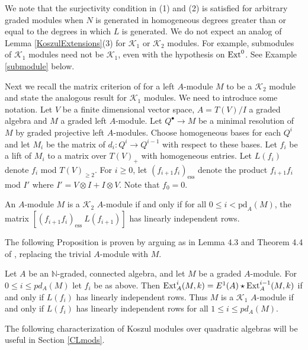 \documentclass[11pt,righttag]{amsart}
\begin{document}
We note that the surjectivity condition in (1) and (2) is satisfied for arbitrary graded modules when $N$ is generated in homogeneous degrees greater than or equal to the degrees in which $L$ is generated.
We do not expect an analog of Lemma \ref{KoszulExtensions}(3) for ${{\mathcal K}}_1$ or ${{\mathcal K}}_2$ modules. 
For example, submodules of ${{\mathcal K}}_1$ modules need not be ${{\mathcal K}}_1$, even with the hypothesis on ${\hbox{{\rm Ext}}}^0$. See Example \ref{submodule} below.  

Next we recall the matrix criterion of  \cite{CS} for a left $A$-module $M$ to be a ${{\mathcal K}}_2$ module and state the analogous result for ${{\mathcal K}}_1$ modules. We need to introduce some notation. Let $V$ be a finite dimensional vector space, $A=T(V)/I$ a graded algebra and $M$ a graded left $A$-module. Let $Q^{\bullet}\rightarrow M$ be a minimal resolution of $M$ by graded projective left $A$-modules. Choose homogeneous bases for each $Q^i$ and let $M_i$ be the matrix of $d_i:Q^i\rightarrow Q^{i-1}$ with respect to these bases. Let $f_i$ be a lift of $M_i$ to a matrix over $T(V)_+$ with homogeneous entries. Let $L(f_i)$ denote $f_i$ mod $T(V)_{\ge 2}$. For $i\ge 0$, let $(f_{i+1}f_i)_{\text{ess}}$ denote the product $f_{i+1}f_i$ mod $I'$ where $I'=V{\otimes} I+I{\otimes} V$. Note that $f_0=0$. 

\begin{lemma}[\cite{CS}]
\label{K2matrix}
An $A$-module $M$ is a ${{\mathcal K}}_2$ $A$-module if and only if for all $0\le i< \text{pd}_A(M)$, the matrix $[(f_{i+1}f_i)_{\text{ess}}\ L(f_{i+1})]$ has linearly independent rows.
\end{lemma}

The following Proposition is proven by arguing as in Lemma 4.3 and Theorem 4.4 of \cite{CS}, replacing the trivial $A$-module with $M$.

\begin{prop}
\label{K2matrixCond}
Let $A$ be an ${{\mathbb N}}$-graded, connected algebra, and let $M$ be a graded $A$-module. For $0\le i\le pd_A(M)$ let $f_i$ be as above. Then ${\hbox{{\rm Ext}}}_A^i(M,k)=E^1(A)\star {\hbox{{\rm Ext}}}_A^{i-1}(M,k)$ if and only if $L(f_i)$ has linearly independent rows. Thus $M$ is a ${{\mathcal K}}_1$ $A$-module if and only if $L(f_i)$ has linearly independent rows for all $1\le i\le pd_A(M)$.
\end{prop}

 The following characterization of Koszul modules over quadratic algebras will be useful in Section \ref{CLmods}.
\end{document}
